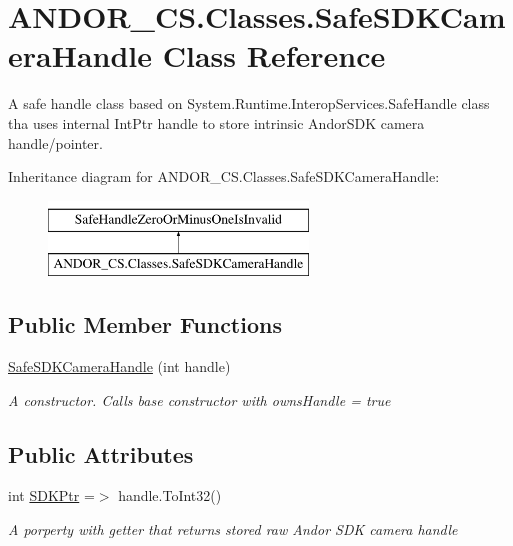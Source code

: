 \hypertarget{class_a_n_d_o_r___c_s_1_1_classes_1_1_safe_s_d_k_camera_handle}{}\section{A\+N\+D\+O\+R\+\_\+\+C\+S.\+Classes.\+Safe\+S\+D\+K\+Camera\+Handle Class Reference}
\label{class_a_n_d_o_r___c_s_1_1_classes_1_1_safe_s_d_k_camera_handle}


A safe handle class based on System.\+Runtime.\+Interop\+Services.\+Safe\+Handle class tha uses internal Int\+Ptr handle to store intrinsic Andor\+S\+DK camera handle/pointer.  


Inheritance diagram for A\+N\+D\+O\+R\+\_\+\+C\+S.\+Classes.\+Safe\+S\+D\+K\+Camera\+Handle\+:\begin{figure}[H]
\begin{center}
\leavevmode
\includegraphics[height=2.000000cm]{class_a_n_d_o_r___c_s_1_1_classes_1_1_safe_s_d_k_camera_handle}
\end{center}
\end{figure}
\subsection*{Public Member Functions}
\begin{DoxyCompactItemize}
\item 
\hyperlink{class_a_n_d_o_r___c_s_1_1_classes_1_1_safe_s_d_k_camera_handle_a08cb65cbcc8a50bcd712aff0cb0c2e2b}{Safe\+S\+D\+K\+Camera\+Handle} (int handle)
\begin{DoxyCompactList}\small\item\em A constructor. Calls base constructor with owns\+Handle = true \end{DoxyCompactList}\end{DoxyCompactItemize}
\subsection*{Public Attributes}
\begin{DoxyCompactItemize}
\item 
int \hyperlink{class_a_n_d_o_r___c_s_1_1_classes_1_1_safe_s_d_k_camera_handle_ac002b1e8cbc88941a4e9db6b37f48a2e}{S\+D\+K\+Ptr} =$>$ handle.\+To\+Int32()
\begin{DoxyCompactList}\small\item\em A porperty with getter that returns stored raw Andor S\+DK camera handle \end{DoxyCompactList}\end{DoxyCompactItemize}
